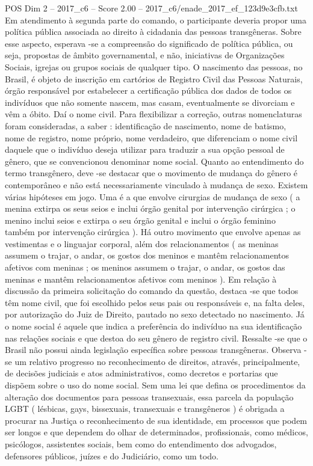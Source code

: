 \begin{textsample}{POS Dim 2 – 2017\_c6 – Score 2.00 – 2017\_c6/enade\_2017\_ef\_123d9e3cfb.txt}
Em atendimento à segunda parte do comando, o participante deveria propor uma política pública associada ao direito à cidadania das pessoas transgêneras.
Sobre esse aspecto, esperava -se a compreensão do significado de política pública, ou seja, propostas de âmbito governamental, e não, iniciativas de Organizações Sociais, igrejas ou grupos sociais de qualquer tipo.
O nascimento das pessoas, no Brasil, é objeto de inscrição em cartórios de Registro Civil das Pessoas Naturais, órgão responsável por estabelecer a certificação pública dos dados de todos os indivíduos que não somente nascem, mas casam, eventualmente se divorciam e vêm a óbito.
Daí o nome civil.
Para flexibilizar a correção, outras nomenclaturas foram consideradas, a saber : identificação de nascimento, nome de batismo, nome de registro, nome próprio, nome verdadeiro, que diferenciam o nome civil daquele que o indivíduo deseja utilizar para traduzir a sua opção pessoal de gênero, que se convencionou denominar nome social.
Quanto ao entendimento do termo transgênero, deve -se destacar que o movimento de mudança do gênero é contemporâneo e não está necessariamente vinculado à mudança de sexo.
Existem várias hipóteses em jogo.
Uma é a que envolve cirurgias de mudança de sexo ( a menina extirpa os seus seios e inclui órgão genital por intervenção cirúrgica ; o menino inclui seios e extirpa o seu órgão genital e inclui o órgão feminino também por intervenção cirúrgica ).
Há outro movimento que envolve apenas as vestimentas e o linguajar corporal, além dos relacionamentos ( as meninas assumem o trajar, o andar, os gostos dos meninos e mantêm relacionamentos afetivos com meninas ; os meninos assumem o trajar, o andar, os gostos das meninas e mantêm relacionamentos afetivos com meninos ).
Em relação à discussão da primeira solicitação do comando da questão, destaca -se que todos têm nome civil, que foi escolhido pelos seus pais ou responsáveis e, na falta deles, por autorização do Juiz de Direito, pautado no sexo detectado no nascimento.
Já o nome social é aquele que indica a preferência do indivíduo na sua identificação nas relações sociais e que destoa do seu gênero de registro civil.
Ressalte -se que o Brasil não possui ainda legislação específica sobre pessoas transgêneras.
Observa -se um relativo progresso no reconhecimento de direitos, através, principalmente, de decisões judiciais e atos administrativos, como decretos e portarias que dispõem sobre o uso do nome social.
Sem uma lei que defina os procedimentos da alteração dos documentos para pessoas transexuais, essa parcela da população LGBT ( lésbicas, gays, bissexuais, transexuais e transgêneros ) é obrigada a procurar na Justiça o reconhecimento de sua identidade, em processos que podem ser longos e que dependem do olhar de determinados, profissionais, como médicos, psicólogos, assistentes sociais, bem como do entendimento dos advogados, defensores públicos, juízes e do Judiciário, como um todo.

\end{textsample}
